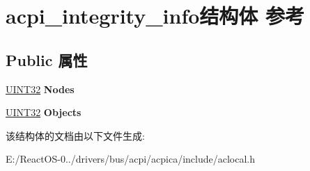 \hypertarget{structacpi__integrity__info}{}\section{acpi\+\_\+integrity\+\_\+info结构体 参考}
\label{structacpi__integrity__info}
\subsection*{Public 属性}
\begin{DoxyCompactItemize}
\item 
\mbox{\label{structacpi__integrity__info_a7b8b05c7dbcefe5dbf69e266ddf476b1}} 
\hyperlink{_processor_bind_8h_ae1e6edbbc26d6fbc71a90190d0266018}{U\+I\+N\+T32} {\bfseries Nodes}
\item 
\mbox{\label{structacpi__integrity__info_a0b8c9f20f47cd886215a0fef9aca6604}} 
\hyperlink{_processor_bind_8h_ae1e6edbbc26d6fbc71a90190d0266018}{U\+I\+N\+T32} {\bfseries Objects}
\end{DoxyCompactItemize}


该结构体的文档由以下文件生成\+:\begin{DoxyCompactItemize}
\item 
E\+:/\+React\+O\+S-\/0../drivers/bus/acpi/acpica/include/aclocal.\+h\end{DoxyCompactItemize}
